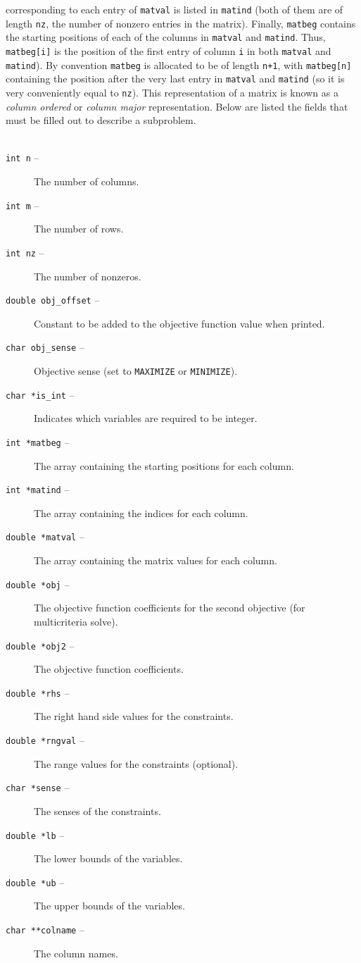 \begin{description}
corresponding to each entry of \texttt{matval} is listed in \texttt{matind}
(both of them are of length \texttt{nz}, the number of nonzero entries in the
matrix). Finally,
\texttt{matbeg} contains the starting positions of each of the columns in 
\texttt{matval} and \texttt{matind}. Thus, \texttt{matbeg[i]} is the position
of the first entry of column \texttt{i} in both \texttt{matval} and
\texttt{matind}). By convention \texttt{matbeg} is allocated to be of length
\texttt{n+1}, with \texttt{matbeg[n]} containing the position after the very
last entry in \texttt{matval} and \texttt{matind} (so it is very conveniently
equal to \texttt{nz}). This representation of a matrix is known as a {\em
column ordered} or {\em column major} representation. Below are listed the
fields that must be filled out to describe a subproblem.\\
\\

\begin{description}
\item [\texttt{int n} --] The number of columns.
\item [\texttt{int m} --] The number of rows.
\item [\texttt{int nz} --] The number of nonzeros.
\item [\texttt{double obj\_offset} --] Constant to be added to the objective
function value when printed.
\item [\texttt{char obj\_sense} --] Objective sense (set to \texttt{MAXIMIZE}
or \texttt{MINIMIZE}).
\item [\texttt{char *is\_int} --] Indicates which variables are required to be 
integer.
\item [\texttt{int *matbeg} -- ] The array containing the starting positions
for each column.  
\item [\texttt{int *matind} --] The array containing the indices for each
column. 
\item [\texttt{double *matval} --] The array containing the matrix values for
each column.
\item [\texttt{double *obj} --] The objective function coefficients for the second objective (for multicriteria solve).
\item [\texttt{double *obj2} --] The objective function coefficients.
\item [\texttt{double *rhs} --] The right hand side values for the
constraints. 
\item [\texttt{double *rngval} --] The range values for the constraints
(optional). 
\item [\texttt{char *sense} --] The senses of the constraints. 
\item [\texttt{double *lb} --] The lower bounds of the variables.
\item [\texttt{double *ub} --] The upper bounds of the variables.
\item [\texttt{char **colname} --] The column names.
\end{description}


\end{description}

